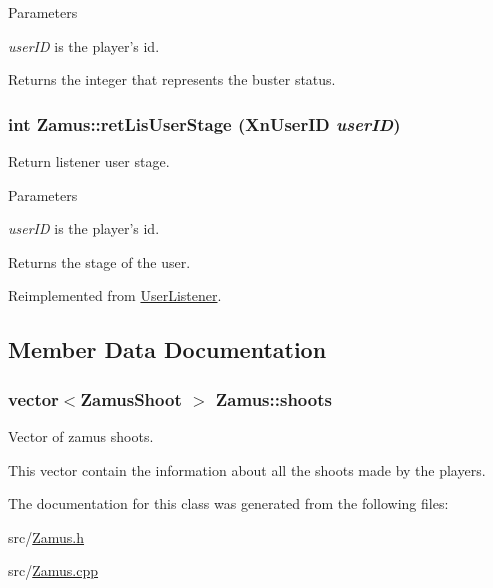 \begin{DoxyParams}{Parameters}
\item[{\em userID}]is the player's id.\end{DoxyParams}
\begin{DoxyReturn}{Returns}
the integer that represents the buster status. 
\end{DoxyReturn}
\hypertarget{classZamus_a727befa3608295027c9db889af9556c1}{
\subsubsection[{retLisUserStage}]{\setlength{\rightskip}{0pt plus 5cm}int Zamus::retLisUserStage (XnUserID {\em userID})}}
\label{classZamus_a727befa3608295027c9db889af9556c1}
Return listener user stage.


\begin{DoxyParams}{Parameters}
\item[{\em userID}]is the player's id.\end{DoxyParams}
\begin{DoxyReturn}{Returns}
the stage of the user. 
\end{DoxyReturn}


Reimplemented from \hyperlink{classUserListener_ad28b54b309b207f197ed238263d1014e}{UserListener}.



\subsection{Member Data Documentation}
\hypertarget{classZamus_a8b8f7d06c64a6571521a82ef7b856189}{
\subsubsection[{shoots}]{\setlength{\rightskip}{0pt plus 5cm}vector$<${\bf ZamusShoot} $>$ {\bf Zamus::shoots}}}
\label{classZamus_a8b8f7d06c64a6571521a82ef7b856189}
Vector of zamus shoots.

This vector contain the information about all the shoots made by the players. 

The documentation for this class was generated from the following files:\begin{DoxyCompactItemize}
\item 
src/\hyperlink{Zamus_8h}{Zamus.h}\item 
src/\hyperlink{Zamus_8cpp}{Zamus.cpp}\end{DoxyCompactItemize}
